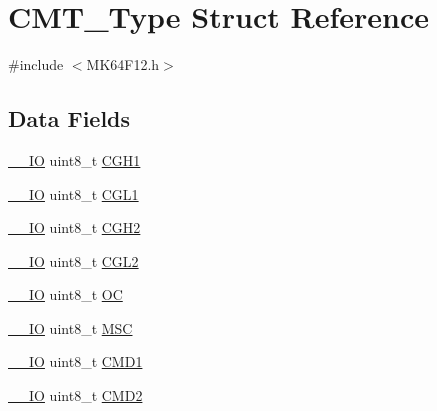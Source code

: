 \hypertarget{struct_c_m_t___type}{}\section{C\+M\+T\+\_\+\+Type Struct Reference}
\label{struct_c_m_t___type}


{\ttfamily \#include $<$M\+K64\+F12.\+h$>$}

\subsection*{Data Fields}
\begin{DoxyCompactItemize}
\item 
\mbox{\hyperlink{core__cm4_8h_aec43007d9998a0a0e01faede4133d6be}{\+\_\+\+\_\+\+IO}} uint8\+\_\+t \mbox{\hyperlink{group___v_r_e_f___peripheral___access___layer_ga309b886425c6fe607ddc0ea652f9b194}{C\+G\+H1}}
\item 
\mbox{\hyperlink{core__cm4_8h_aec43007d9998a0a0e01faede4133d6be}{\+\_\+\+\_\+\+IO}} uint8\+\_\+t \mbox{\hyperlink{group___v_r_e_f___peripheral___access___layer_ga11bdc2466acff90f1374d817bc1ed866}{C\+G\+L1}}
\item 
\mbox{\hyperlink{core__cm4_8h_aec43007d9998a0a0e01faede4133d6be}{\+\_\+\+\_\+\+IO}} uint8\+\_\+t \mbox{\hyperlink{group___v_r_e_f___peripheral___access___layer_ga84d40ea282f57da8f5fae00f40398a5b}{C\+G\+H2}}
\item 
\mbox{\hyperlink{core__cm4_8h_aec43007d9998a0a0e01faede4133d6be}{\+\_\+\+\_\+\+IO}} uint8\+\_\+t \mbox{\hyperlink{group___v_r_e_f___peripheral___access___layer_ga5b34f67e8f631ee467ef7bb5807928af}{C\+G\+L2}}
\item 
\mbox{\hyperlink{core__cm4_8h_aec43007d9998a0a0e01faede4133d6be}{\+\_\+\+\_\+\+IO}} uint8\+\_\+t \mbox{\hyperlink{group___v_r_e_f___peripheral___access___layer_ga84eb9eb3539cff16c79647ab05ac460a}{OC}}
\item 
\mbox{\hyperlink{core__cm4_8h_aec43007d9998a0a0e01faede4133d6be}{\+\_\+\+\_\+\+IO}} uint8\+\_\+t \mbox{\hyperlink{group___v_r_e_f___peripheral___access___layer_ga63059b18d3d1ea9d10b88744c30e6f20}{M\+SC}}
\item 
\mbox{\hyperlink{core__cm4_8h_aec43007d9998a0a0e01faede4133d6be}{\+\_\+\+\_\+\+IO}} uint8\+\_\+t \mbox{\hyperlink{group___v_r_e_f___peripheral___access___layer_gaadbb65d4dd1c34987caf4632f7674dd1}{C\+M\+D1}}
\item 
\mbox{\hyperlink{core__cm4_8h_aec43007d9998a0a0e01faede4133d6be}{\+\_\+\+\_\+\+IO}} uint8\+\_\+t \mbox{\hyperlink{group___v_r_e_f___peripheral___access___layer_ga9c388250948760641b6e24886ebfd605}{C\+M\+D2}}

\end{DoxyCompactItemize}
